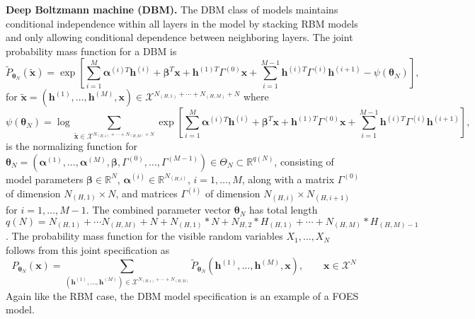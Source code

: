 \documentclass[12pt]{article}
\theoremstyle{definition}
\begin{document}
\noindent  \textbf{Deep Boltzmann machine (DBM).} The DBM class of models maintains
conditional independence within all layers in the model by stacking RBM
models and only allowing conditional dependence between neighboring
layers. The joint probability mass function for a DBM is \[
\tilde{P}_{\boldsymbol \theta_N} ( \tilde{\boldsymbol x} ) = \exp\left[ \sum\limits_{i = 1}^M\boldsymbol \alpha^{(i)T} \boldsymbol h^{(i)} + \boldsymbol \beta^T \boldsymbol x + \boldsymbol h^{(1)T} \Gamma^{(0)} \boldsymbol x + \sum\limits_{i = 1}^{M - 1} \boldsymbol h^{(i)T} \Gamma^{(i)} \boldsymbol h^{(i + 1)} - \psi(\boldsymbol \theta_N) \right],
\] for
\(\tilde{\boldsymbol x} = (\boldsymbol h^{(1)}, \dots, \boldsymbol h^{(M)}, \boldsymbol x) \in \mathcal{X}^{N_{(H,1)} + \cdots + N_{(H,M)} +N}\)
where \[
\psi(\boldsymbol \theta_N) = \log \sum\limits_{\tilde{\boldsymbol x} \in \mathcal{X}^{N_{(H,1)} + \cdots + N_{(H,M)} +N}} \exp\left[ \sum\limits_{i = 1}^M\boldsymbol \alpha^{(i)T} \boldsymbol h^{(i)} + \boldsymbol \beta^T \boldsymbol x + \boldsymbol h^{(1)T} \Gamma^{(0)} \boldsymbol x + \sum\limits_{i = 1}^{M - 1} \boldsymbol h^{(i)T} \Gamma^{(i)} \boldsymbol h^{(i + 1)}\right],
\] is the normalizing function for $\boldsymbol \theta_N = (\boldsymbol \alpha^{(1)}, \dots, \boldsymbol \alpha^{(M)}, \boldsymbol \beta,\Gamma^{(0)}, \dots, \Gamma^{(M - 1)}) \in \Theta_N \subset \mathbb{R}^{q(N)} $, consisting of
model parameters $\boldsymbol \beta \in \mathbb{R}^N$,
\(\boldsymbol \alpha^{(i)} \in \mathbb{R}^{N_{(H,i)}}\),
\(i = 1, \dots, M\), along with a matrix \(\Gamma^{(0)}\) of dimension
\(N_{(H,1)} \times N\), and matrices \(\Gamma^{(i)}\) of dimension
\(N_{(H,i)} \times N_{(H,i+1)}\) for \(i = 1, \dots, M-1\). The combined   parameter vector $\boldsymbol \theta_N$ has total length
\(q(N)= N_{(H,1)}+\cdots N_{(H,M)} + N + N_{(H,1)}*N+N_{H,2}*H_{(H,1)}+\cdots +N_{(H,M)}*H_{(H,M)-1}\).
The probability mass function for the visible random variables
\(X_1, \dots, X_N\) follows from this joint specification as \[
P_{\boldsymbol \theta_N} (\boldsymbol x) = \sum\limits_{(\boldsymbol h^{(1)}, \dots, \boldsymbol h^{(M)}) \in \mathcal{X}^{N_{(H,1)} + \cdots + N_{(H,M)}}} \tilde{P}_{\boldsymbol \theta_N} (\boldsymbol h^{(1)}, \dots, \boldsymbol h^{(M)}, \boldsymbol x) , \qquad \boldsymbol x \in \mathcal{X}^N
\] Again like the RBM case, the DBM model specification is an example of
a FOES model.\\
\end{document}
